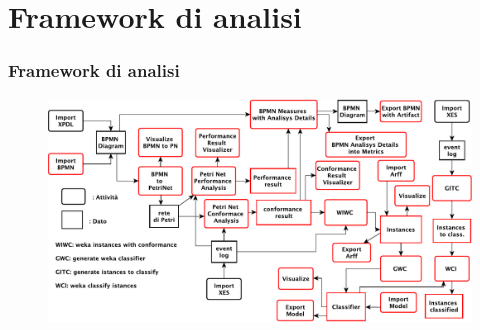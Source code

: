\documentclass[10pt]{beamer}
\begin{document}
	\section{Framework di analisi}
	\begin{frame}
	\frametitle{Framework di analisi}
	\begin{figure}
	\centering 
	\includegraphics[scale=0.60]{./fig/PromPlugin_pres}
	\end{figure}
	\end{frame}
	
	
	
\end{document}
